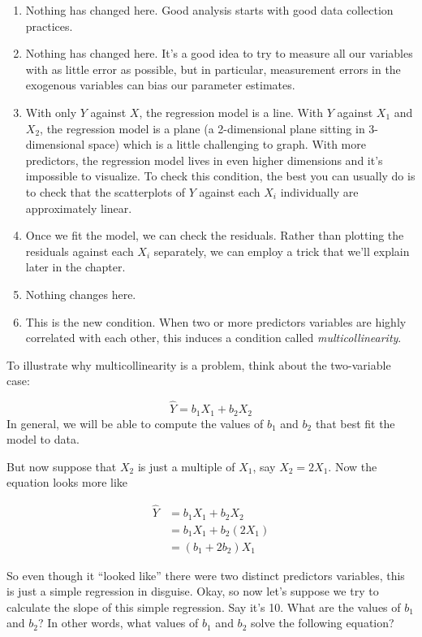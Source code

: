 \documentclass[
]{book}
\providecommand{\tightlist}{%
  \setlength{\itemsep}{0pt}\setlength{\parskip}{0pt}}
\begin{document}
\begin{enumerate}
\def\labelenumi{\arabic{enumi}.}
\tightlist
\item
  Nothing has changed here. Good analysis starts with good data collection practices.
\item
  Nothing has changed here. It's a good idea to try to measure all our variables with as little error as possible, but in particular, measurement errors in the exogenous variables can bias our parameter estimates.
\item
  With only \(Y\) against \(X\), the regression model is a line. With \(Y\) against \(X_{1}\) and \(X_{2}\), the regression model is a plane (a 2-dimensional plane sitting in 3-dimensional space) which is a little challenging to graph. With more predictors, the regression model lives in even higher dimensions and it's impossible to visualize. To check this condition, the best you can usually do is to check that the scatterplots of \(Y\) against each \(X_{i}\) individually are approximately linear.
\item
  Once we fit the model, we can check the residuals. Rather than plotting the residuals against each \(X_{i}\) separately, we can employ a trick that we'll explain later in the chapter.
\item
  Nothing changes here.
\item
  This is the new condition. When two or more predictors variables are highly correlated with each other, this induces a condition called \emph{multicollinearity}.
\end{enumerate}

To illustrate why multicollinearity is a problem, think about the two-variable case:

\[
\hat{Y} = b_{1}X_{1} + b_{2}X_{2}
\]
In general, we will be able to compute the values of \(b_{1}\) and \(b_{2}\) that best fit the model to data.

But now suppose that \(X_{2}\) is just a multiple of \(X_{1}\), say \(X_{2} = 2X_{1}\). Now the equation looks more like

\begin{align}
\hat{Y} &= b_{1}X_{1} + b_{2}X_{2} \\
        &= b_{1}X_{1} + b_{2}(2 X_{1}) \\
        &= (b_{1} + 2b_{2})X_{1}
\end{align}

So even though it ``looked like'' there were two distinct predictors variables, this is just a simple regression in disguise. Okay, so now let's suppose we try to calculate the slope of this simple regression. Say it's 10. What are the values of \(b_{1}\) and \(b_{2}\)? In other words, what values of \(b_{1}\) and \(b_{2}\) solve the following equation?
\end{document}
